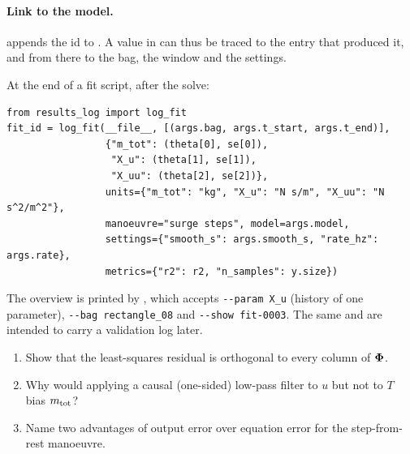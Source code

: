 \paragraph{Link to the model.}  appends the
id to . A value in  can thus be traced to the entry
that produced it, and from there to the bag, the window and the settings.

\begin{incode}
At the end of a fit script, after the solve:
\begin{lstlisting}
from results_log import log_fit
fit_id = log_fit(__file__, [(args.bag, args.t_start, args.t_end)],
                 {"m_tot": (theta[0], se[0]),
                  "X_u": (theta[1], se[1]),
                  "X_uu": (theta[2], se[2])},
                 units={"m_tot": "kg", "X_u": "N s/m", "X_uu": "N s^2/m^2"},
                 manoeuvre="surge steps", model=args.model,
                 settings={"smooth_s": args.smooth_s, "rate_hz": args.rate},
                 metrics={"r2": r2, "n_samples": y.size})
\end{lstlisting}
The overview is printed by , which accepts
\texttt{-{}-param X\_u} (history of one parameter), \texttt{-{}-bag rectangle\_08} and
\texttt{-{}-show fit-0003}. The same  and  are intended to carry
a validation log later.
\end{incode}

\begin{questions}
\begin{enumerate}
  \item Show that the least-squares residual is orthogonal to every column of $\boldsymbol{\Phi}$.
  \item Why would applying a causal (one-sided) low-pass filter to $u$ but not to $T$ bias $m_\mathrm{tot}$?
  \item Name two advantages of output error over equation error for the step-from-rest manoeuvre.
\end{enumerate}
\end{questions}
